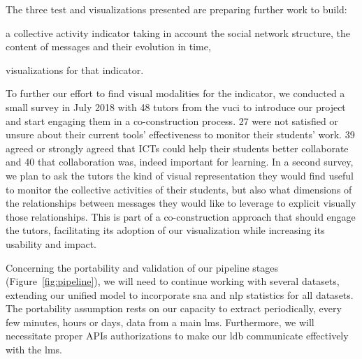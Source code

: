 \documentclass[a4paper,twoside]{article}
\begin{document}
The three test and visualizations presented are preparing further work to build:
\begin{inparaenum}
\item a collective activity indicator taking in account the social network structure, the content of messages and their evolution in time,
\item visualizations for that indicator.
\end{inparaenum}

To further our effort to find visual modalities for the indicator, we conducted a small survey in July 2018 with 48 tutors from the \gls{vuci} to introduce our project and start engaging them in a co-construction process.   27 were not satisfied or unsure about their current tools' effectiveness to monitor their students' work.  39 agreed or strongly agreed that ICTs could help their students better collaborate and 40 that collaboration was, indeed important for learning.  In a second survey, we plan to ask the tutors the kind of visual representation they would find useful to monitor the collective activities of their students, but also what dimensions of the relationships between messages they would like to leverage to explicit visually those relationships.  This is part of a co-construction approach that should engage the tutors, facilitating its adoption of our visualization while increasing its usability and impact.

Concerning the portability and validation of our pipeline stages (Figure~\ref{fig:pipeline}), we will need to continue working with several datasets, extending our unified model to incorporate \gls{sna} and \gls{nlp} statistics for all datasets.  The portability assumption rests on our capacity to extract periodically, every few minutes, hours or days, data from a main \gls{lms}.  Furthermore, we will necessitate proper APIs authorizations to make our \gls{ldb} communicate effectively with the \gls{lms}.

\end{document}
